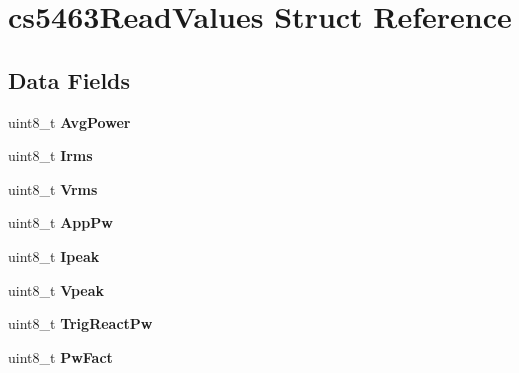 \hypertarget{structcs5463ReadValues}{\section{cs5463\-Read\-Values Struct Reference}
\label{structcs5463ReadValues}
}
\subsection*{Data Fields}
\begin{DoxyCompactItemize}
\item 
\hypertarget{structcs5463ReadValues_a10cc2d28aff2627adfff2ce6a29ea782}{uint8\-\_\-t {\bfseries Avg\-Power}}\label{structcs5463ReadValues_a10cc2d28aff2627adfff2ce6a29ea782}

\item 
\hypertarget{structcs5463ReadValues_ae05546f62325dd173c5af871392fabad}{uint8\-\_\-t {\bfseries Irms}}\label{structcs5463ReadValues_ae05546f62325dd173c5af871392fabad}

\item 
\hypertarget{structcs5463ReadValues_a1afaf3578f901701c1fec48b83df94b3}{uint8\-\_\-t {\bfseries Vrms}}\label{structcs5463ReadValues_a1afaf3578f901701c1fec48b83df94b3}

\item 
\hypertarget{structcs5463ReadValues_aa34597919a1d079dbeaaf9755c82126e}{uint8\-\_\-t {\bfseries App\-Pw}}\label{structcs5463ReadValues_aa34597919a1d079dbeaaf9755c82126e}

\item 
\hypertarget{structcs5463ReadValues_a9253d4c78a85b38ed7aa049a90152e73}{uint8\-\_\-t {\bfseries Ipeak}}\label{structcs5463ReadValues_a9253d4c78a85b38ed7aa049a90152e73}

\item 
\hypertarget{structcs5463ReadValues_af1ccafa48e301948565bd41bffdc83a0}{uint8\-\_\-t {\bfseries Vpeak}}\label{structcs5463ReadValues_af1ccafa48e301948565bd41bffdc83a0}

\item 
\hypertarget{structcs5463ReadValues_a16a6a9a8599bb4cb000202fabe929ab8}{uint8\-\_\-t {\bfseries Trig\-React\-Pw}}\label{structcs5463ReadValues_a16a6a9a8599bb4cb000202fabe929ab8}

\item 
\hypertarget{structcs5463ReadValues_a6a2003542ead77825b7da4bb56ff8f26}{uint8\-\_\-t {\bfseries Pw\-Fact}}\label{structcs5463ReadValues_a6a2003542ead77825b7da4bb56ff8f26}


\end{DoxyCompactItemize}
